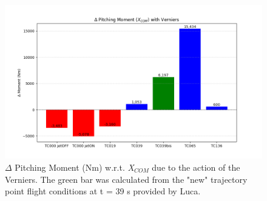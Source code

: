 \documentclass[12pt]{article}
\begin{document}
\begin{figure}[H]
    \centering
    \includegraphics[width=\linewidth]{figs/DeltaPmoment.png}
    \caption{{$\Delta$ Pitching Moment (Nm) w.r.t. \textit{X$_{COM}$} due to the action of the Verniers.} The green bar was calculated from the "new" trajectory point flight conditions at t = 39 s provided by Luca.}
    \label{fig:DPmoment}
\end{figure}
\end{document}
